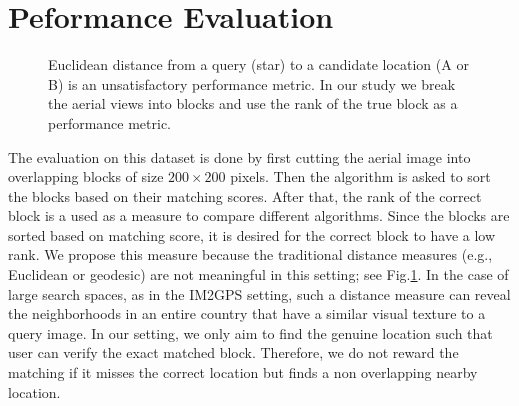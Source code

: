 \section{Peformance Evaluation}

\label{sec:evaluation}

\begin{figure}[ht] 
\centering
{}
\caption[]{ Euclidean distance from a query (star) to a candidate location (A or B) is an unsatisfactory performance metric.  In our study we break the aerial views into blocks and use the rank of the true block as a performance metric.}
\label{eval}
\end{figure}


The evaluation on this dataset is done by first cutting the aerial image into overlapping blocks of size $200 \times 200$ pixels. Then the algorithm is asked to sort the blocks based on their matching scores. After that, the rank of the correct block is a used as a measure to compare different algorithms. Since the blocks are sorted based on matching score, it is desired for the correct block to have a low rank. We propose this measure because the traditional distance measures (e.g., Euclidean or geodesic) are not meaningful in this setting; see Fig.\ref{eval}.  In the case of large search spaces, as in the IM2GPS setting, such a distance measure can reveal the neighborhoods in an entire country that have a similar visual texture to a query image.  In our setting, we only aim to find the genuine location such that user can verify the exact matched block. Therefore, we do not reward the matching if it misses the correct location but finds a non overlapping nearby location.

